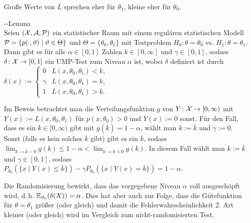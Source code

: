 \begin{Bem}
    Große Werte von $L$ sprechen eher für $\theta_1$, kleine eher für $\theta_0$.
\end{Bem}

\begin{Satz}{--Lemma}\\
    Seien $(\X, \A, \P)$ ein statistischer Raum mit einem regulären statistischen Modell\\
    $\P = \{p(\cdot, \theta) \;|\; \theta \in \Theta\}$ und
    $\Theta = \{\theta_0, \theta_1\}$ mit Testproblem
    $H_0\colon \theta = \theta_0$ vs. $H_1\colon \theta = \theta_1$.\\
    Dann gibt es für alle $\alpha \in [0, 1]$ Zahlen $k \in [0, \infty]$ und $\gamma \in [0, 1]$,
    sodass $\delta\colon \X \rightarrow [0, 1]$ ein UMP-Test zum Niveau $\alpha$ ist, wobei
    $\delta$ definiert ist durch
    $\delta(x) := \begin{cases}0 & L(x, \theta_0, \theta_1) < k,\\
    \gamma & L(x, \theta_0, \theta_1) = k,\\1 & L(x, \theta_0, \theta_1) > k.\end{cases}$
\end{Satz}

\begin{Bem}
    Im Beweis betrachtet man die Verteilungsfunktion $g$ von $Y\colon \X \rightarrow [0, \infty)$
    mit $Y(x) := L(x, \theta_0, \theta_1)$ für $p(x, \theta_0) > 0$ und $Y(x) := 0$ sonst.
    Für den Fall, dass es ein $\overline{k} \in [0, \infty)$ gibt mit
    $g(\overline{k}) = 1 - \alpha$, wählt man $k := \overline{k}$ und $\gamma := 0$.
    Sonst (falls es kein solches $\overline{k}$ gibt) gibt es ein $\overline{k}$, sodass
    $\lim_{k \to \overline{k}-0} g(k) \le 1 - \alpha < \lim_{k \to \overline{k}+0} g(k)$.
    In diesem Fall wählt man $k := \overline{k}$ und $\gamma \in [0, 1]$, sodass
    $P_{\theta_0}(\{x \;|\; Y(x) \le \overline{k}\}) -
    \gamma P_{\theta_0}(\{x \;|\; Y(x) = \overline{k}\}) = 1 - \alpha$.
    
    Die Randomisierung bewirkt, dass das vorgegebene Niveau $\alpha$ voll ausgeschöpft wird,
    d.\,h. $\EE_{\theta_0}(\delta(X)) = \alpha$.
    Dies hat aber auch zur Folge, dass die Gütefunktion für $\theta = \theta_1$
    größer (oder gleich) und damit die
    Fehlerwahrscheinlichkeit 2. Art kleiner (oder gleich) wird
    im Vergleich zum nicht-randomisierten Test.
\end{Bem}

